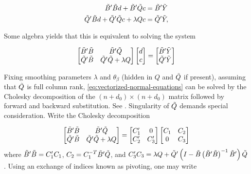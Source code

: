 \begin{align}
\begin{split}
\tilde{B}'\tilde{B} d + \tilde{B}'\tilde{Q} c &= \tilde{B}' \tilde{Y} \\
\tilde{Q}'\tilde{B} d + \tilde{Q}'\tilde{Q} c + \lambda Q c &= \tilde{Q}' \tilde{Y}, 
\end{split}
\end{align}

\noindent
Some algebra yields that this is equivalent to solving the system

\begin{equation} \label{eq:vectorized-normal-equations}
\begin{bmatrix}
\tilde{B}'\tilde{B} & \tilde{B}'\tilde{Q} \\
\tilde{Q}'\tilde{B} & \tilde{Q}'\tilde{Q} + \lambda Q\\
\end{bmatrix}
\begin{bmatrix}
d\\
c\\
\end{bmatrix}
= \begin{bmatrix}
\tilde{B}'\tilde{Y} \\
 \tilde{Q}'\tilde{Y}\\
\end{bmatrix}
\end{equation}


Fixing smoothing parameters $\lambda$ and $\theta_\beta$ (hidden in $Q$ and $\tilde{Q}$ if present), assuming that $\tilde{Q}$ is full column rank, \ref{eq:vectorized-normal-equations} can be solved by the Cholesky decomposition of the $\left( n + d_0 \right) \times \left( n + d_0 \right)$ matrix followed by forward and backward substitution. See \citet{golub2012matrix}. Singularity of $\tilde{Q}$ demands special consideration. Write the Cholesky decomposition

\begin{equation} \label{eq:normal-equation-cholesky}
\begin{bmatrix}
\tilde{B}'\tilde{B} & \tilde{B}'\tilde{Q} \\
\tilde{Q}'\tilde{B} & \tilde{Q}'\tilde{Q} + \lambda Q\\
\end{bmatrix}
= \begin{bmatrix}
C'_1 & 0 \\
C'_2  & C'_3 
\end{bmatrix}
\begin{bmatrix}
C_1 & C_2 \\
0  & C_3 
\end{bmatrix}
\end{equation}
\noindent
where $\tilde{B}'\tilde{B} = C'_1 C_1$, $C_2 = C_1^{-T} \tilde{B}' \tilde{Q}$, and $C'_3 C_3 = \lambda Q +  \tilde{Q}'\left( I - \tilde{B}\left( \tilde{B}' \tilde{B} \right)^{-1} \tilde{B}' \right)\tilde{Q}$. Using an exchange of indices known as pivoting, one may write 

